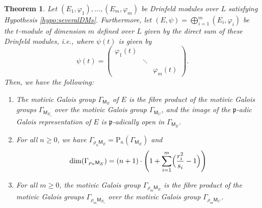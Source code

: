 \documentclass[10pt,a4paper]{amsart}
\theoremstyle{plain} %
\newtheorem{Theorem}{Theorem}[section]
\theoremstyle{definition}
\theoremstyle{remark}
\newcommand{\fp}{\mathfrak{p}}  %
\newcommand{\rP}[1]{\mathrm{P}_{\!#1}}
\newcommand{\mot}{\mathsf{M}}  %
\numberwithin{equation}{subsection}
\begin{document}
\begin{Theorem}\label{T:severalDMs}
Let $(E_1,\varphi_1), \ldots, (E_m,\varphi_m)$ be Drinfeld modules over $L$ satisfying Hypothesis \ref{hypo:severalDMs}.
Furthermore, let $(E, \psi)=\bigoplus_{i=1}^m (E_i,\varphi_i)$ be the $t$-module of dimension $m$ defined over $L$ given by the direct sum of these Drinfeld modules, i.e., where $\psi(t)$ is given by
\[
\psi(t) = \begin{pmatrix} \varphi_1(t) & & \\ & \ddots &  \\ & & \varphi_m(t) \end{pmatrix}.
\]
Then, we have the following:
\begin{enumerate}
    \item \label{item:fibre-product} The motivic Galois group $\Gamma_{\mot_E}$ of $E$ is the fibre product of the motivic Galois groups $\Gamma_{\mot_{E_i}}$ over the motivic Galois group $\Gamma_{\mot_{C}}$, and the image of the $\fp$-adic Galois representation of $E$ is $\fp$-adically open in $\Gamma_{\mot_E}$.
    \item \label{item:dimension-formula} For all $n\geq 0$, we have $\Gamma_{\rho_{n}\mot_E}=\rP{n}(\Gamma_{\mot_E})$ and 
    \begin{equation}\label{E:dimproDMeg}
\dim(\Gamma_{\rho_{n}\mot_E}) = (n+1)\cdot \left( 1 + \sum_{i=1}^m \Bigl(\frac{r_i^2}{s_i} -1 \Bigr) \right) 
    \end{equation} 
    \item \label{item:fibre-product-prolong} For all $m\geq 0$, the motivic Galois group $\Gamma_{\rho_{m}\mot_E}$  is the fibre product of the motivic Galois groups $\Gamma_{\rho_{m}\mot_{E_i}}$ over the motivic Galois group $\Gamma_{\rho_{m}\mot_{C}}$.    
\end{enumerate}
\end{Theorem}
\end{document}
